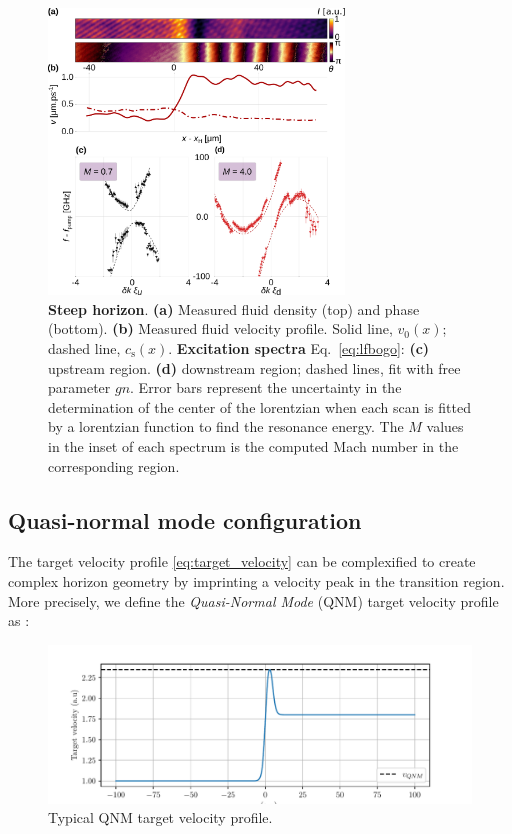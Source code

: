 \begin{figure}
    \centering
    \includegraphics[width=0.7\textwidth]{chap_custom_st/fig/bh_steep.pdf}
    \caption{\textbf{Steep horizon}.    
    \textbf{(a)} Measured fluid density (top) and phase (bottom).
    \textbf{(b)} Measured fluid velocity profile.
    Solid line, $v_0(x)$; dashed line, $c_\mathrm{s}(x)$.
    \textbf{Excitation spectra} Eq.~\eqref{eq:lfbogo}: \textbf{(c)} upstream region. \textbf{(d)} downstream region; dashed lines, fit with free parameter $gn$. Error bars represent the uncertainty in the determination
    of the center of the lorentzian when each scan is fitted by a lorentzian function to find the resonance energy. The $M$ values in the inset of each spectrum is the computed Mach number in the corresponding region. }
    \label{fig:bh_steep}
\end{figure}

\subsection{Quasi-normal mode configuration}

The target velocity profile \autoref{eq:target_velocity} can be complexified to create complex horizon geometry by imprinting 
a velocity peak in the transition region. More precisely, we define the \textit{Quasi-Normal Mode} (QNM) target velocity profile as :

\begin{figure}
    \centering
    \includegraphics[width=1\textwidth]{chap_custom_st/fig/qnm_target_velocity.pdf}
    \caption{Typical QNM target velocity profile.}
    \label{fig:qnm_target_velocity}
\end{figure}


